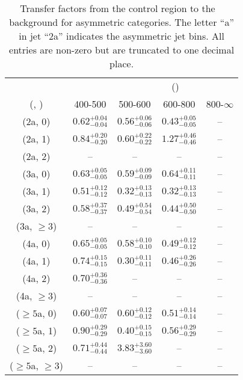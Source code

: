 \begin{table}[h!]
\tiny
\centering
\caption{Transfer factors from the \gj control region to the \zInv~ background for asymmetric categories. The letter ``a'' in jet \eg ``2a''  indicates the asymmetric jet bins. All entries are non-zero but are truncated to one decimal place.\label{tab:tf_gj_zinv_asym}}
\begin{tabular}
{ccccc}
	\hline\hline
&	& \multicolumn{4}{c}{\scalht (\gev)} \\ 
	 (\njet,  \nb) & 400-500 & 500-600 & 600-800 & 800-$\infty$ \\ [0.8ex] 
\hline
	(2a, 0) & $0.62^{+ 0.04 }_{- 0.04 }$ & $0.56^{+ 0.06 }_{- 0.06 }$ & $0.43^{+ 0.05 }_{- 0.05 }$ & -- \\[0.5ex] 
	(2a, 1) & $0.84^{+ 0.20 }_{- 0.20 }$ & $0.60^{+ 0.22 }_{- 0.22 }$ & $1.27^{+ 0.46 }_{- 0.46 }$ & -- \\[0.5ex] 
	(2a, 2) & -- & -- & -- & -- \\[0.5ex] 
	(3a, 0) & $0.63^{+ 0.05 }_{- 0.05 }$ & $0.59^{+ 0.09 }_{- 0.09 }$ & $0.64^{+ 0.11 }_{- 0.11 }$ & -- \\[0.5ex] 
	(3a, 1) & $0.51^{+ 0.12 }_{- 0.12 }$ & $0.32^{+ 0.13 }_{- 0.13 }$ & $0.32^{+ 0.13 }_{- 0.13 }$ & -- \\[0.5ex] 
	(3a, 2) & $0.58^{+ 0.37 }_{- 0.37 }$ & $0.49^{+ 0.54 }_{- 0.54 }$ & $0.44^{+ 0.50 }_{- 0.50 }$ & -- \\[0.5ex] 
	(3a, $\ge3$) & -- & -- & -- & -- \\[0.5ex] 
	(4a, 0) & $0.65^{+ 0.05 }_{- 0.05 }$ & $0.58^{+ 0.10 }_{- 0.10 }$ & $0.49^{+ 0.12 }_{- 0.12 }$ & -- \\[0.5ex] 
	(4a, 1) & $0.74^{+ 0.15 }_{- 0.15 }$ & $0.30^{+ 0.11 }_{- 0.11 }$ & $0.46^{+ 0.26 }_{- 0.26 }$ & -- \\[0.5ex] 
	(4a, 2) & $0.70^{+ 0.36 }_{- 0.36 }$ & -- & -- & -- \\[0.5ex] 
	(4a, $\ge3$) & -- & -- & -- & -- \\[0.5ex] 
	($\ge5$a, 0) & $0.60^{+ 0.07 }_{- 0.07 }$ & $0.60^{+ 0.12 }_{- 0.12 }$ & $0.51^{+ 0.14 }_{- 0.14 }$ & -- \\[0.5ex] 
	($\ge5$a, 1) & $0.90^{+ 0.29 }_{- 0.29 }$ & $0.40^{+ 0.15 }_{- 0.15 }$ & $0.56^{+ 0.29 }_{- 0.29 }$ & -- \\[0.5ex] 
	($\ge5$a, 2) & $0.71^{+ 0.44 }_{- 0.44 }$ & $3.83^{+ 3.60 }_{- 3.60 }$ & -- & -- \\[0.5ex] 
	($\ge5$a, $\ge3$) & -- & -- & -- & -- \\[0.5ex] 
	\hline
	\hline
\end{tabular}
\end{table}
